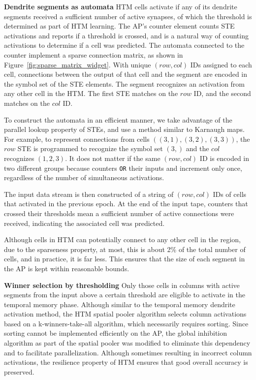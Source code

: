 \textbf{Dendrite segments as automata}
HTM cells activate if any of its dendrite segments received a sufficient number of active synapses, of which the threshold is determined as part of HTM learning.
The AP's counter element counts STE activations and reports if a threshold is crossed, and is a natural way of counting activations to determine if a cell was predicted.
The automata connected to the counter implement a sparse connection matrix, as shown in Figure~\ref{fig:sparse_matrix_widget}.
With unique $(row, col)$ IDs assigned to each cell, connections between the output of that cell and the segment are encoded in the symbol set of the STE elements.
The segment recognizes an activation from any other cell in the HTM.
The first STE matches on the $row$ ID, and the second matches on the $col$ ID.

To construct the automata in an efficient manner, we take advantage of the parallel lookup property of STEs, and use a method similar to Karnaugh maps.
For example, to represent connections from cells $((3, 1), (3, 2), (3, 3))$, the $row$ STE is programmed to recognize the symbol set $(3,)$ and the $col$ recognizes $(1, 2, 3)$.
It does not matter if the same $(row, col)$ ID is encoded in two different groups because counters \texttt{OR} their inputs and increment only once, regardless of the number of simultaneous activations.

The input data stream is then constructed of a string of $(row, col)$ IDs of cells that activated in the previous epoch.
At the end of the input tape, counters that crossed their thresholds mean a sufficient number of active connections were received, indicating the associated cell was predicted.

Although cells in HTM can potentially connect to any other cell in the region, due to the sparseness property, at most, this is about 2\% of the total number of cells, and in practice, it is far less. This ensures that the size of each segment in the AP is kept within reasonable bounds.

\textbf{Winner selection by thresholding}
Only those cells in columns with active segments from the input above a certain threshold are eligible to activate in the temporal memory phase.
Although similar to the temporal memory dendrite activation method, the HTM spatial pooler algorithm selects column activations based on a k-winners-take-all algorithm, which necessarily requires sorting.
Since sorting cannot be implemented efficiently on the AP, the global inhibition algorithm as part of the spatial pooler was modified to eliminate this dependency and to facilitate parallelization.
Although sometimes resulting in incorrect column activations, the resilience property of HTM ensures that good overall accuracy is preserved.

